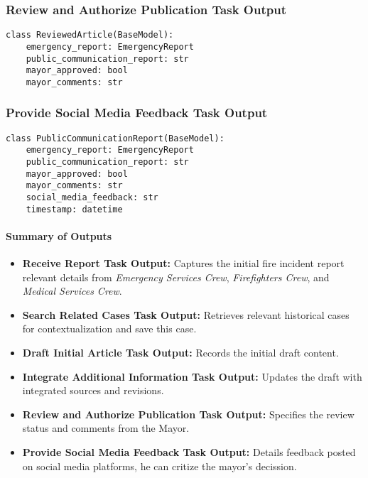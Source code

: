 \subsubsection{Review and Authorize Publication Task Output}
\begin{lstlisting}[caption={Pydantic model for Review and Authorize Publication Task Output}]
class ReviewedArticle(BaseModel):
    emergency_report: EmergencyReport
    public_communication_report: str
    mayor_approved: bool
    mayor_comments: str
\end{lstlisting}

\subsubsection{Provide Social Media Feedback Task Output}
\begin{lstlisting}[caption={Pydantic model for Provide Social Media Feedback Task Output}]
class PublicCommunicationReport(BaseModel):
    emergency_report: EmergencyReport
    public_communication_report: str
    mayor_approved: bool
    mayor_comments: str
    social_media_feedback: str
    timestamp: datetime
\end{lstlisting}

\paragraph{Summary of Outputs}
\begin{itemize}
    \item \textbf{Receive Report Task Output:} Captures the initial fire incident report relevant details from \textit{Emergency Services Crew}, \textit{Firefighters Crew}, and \textit{Medical Services Crew}.
    \item \textbf{Search Related Cases Task Output:} Retrieves relevant historical cases for contextualization and save this case.
    \item \textbf{Draft Initial Article Task Output:} Records the initial draft content.
    \item \textbf{Integrate Additional Information Task Output:} Updates the draft with integrated sources and revisions.
    \item \textbf{Review and Authorize Publication Task Output:} Specifies the review status and comments from the Mayor.
    \item \textbf{Provide Social Media Feedback Task Output:} Details feedback posted on social media platforms, he can critize the mayor's decission.
\end{itemize}
